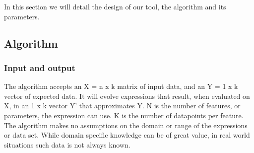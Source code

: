 In this section we will detail the design of our tool, the algorithm and its parameters. 
\subsection{Algorithm}
\subsubsection{Input and output}
The algorithm accepts an X = n x k matrix of input data, and an Y = 1 x k  vector of expected data. It will evolve expressions that result, when evaluated on X, in an 1 x k vector Y' that approximates Y. N is the number of features, or parameters, the expression can use. K is the number of datapoints per feature. The algorithm makes no assumptions on the domain or range of the expressions or data set. While domain specific knowledge can be of great value, in real world situations such data is not always known.

